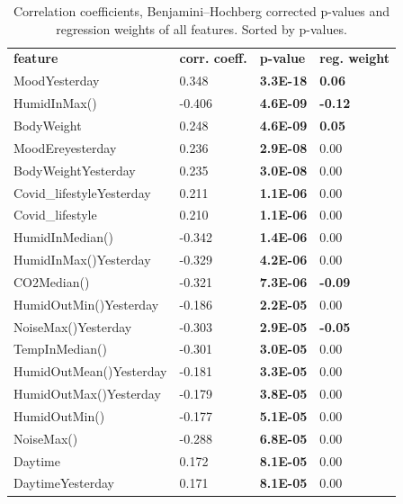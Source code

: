 \documentclass[conference]{IEEEtran}
\begin{document}
\begin{table}[]
\caption[]{Correlation coefficients, Benjamini–Hochberg corrected p-values and regression weights of all features. Sorted by p-values.}
\label{tab:features}

\begin{tabular}{llll}
\textbf{feature} & \textbf{corr. coeff.} & \textbf{p-value} & \textbf{reg. weight} \\
MoodYesterday                  & 0.348  & \textbf{3.3E-18} & \textbf{0.06}  \\
HumidInMax()                   & -0.406 & \textbf{4.6E-09} & \textbf{-0.12} \\
BodyWeight                     & 0.248  & \textbf{4.6E-09} & \textbf{0.05}  \\
MoodEreyesterday               & 0.236  & \textbf{2.9E-08} & 0.00           \\
BodyWeightYesterday            & 0.235  & \textbf{3.0E-08} & 0.00           \\
Covid\_lifestyleYesterday      & 0.211  & \textbf{1.1E-06} & 0.00           \\
Covid\_lifestyle               & 0.210  & \textbf{1.1E-06} & 0.00           \\
HumidInMedian()                & -0.342 & \textbf{1.4E-06} & 0.00           \\
HumidInMax()Yesterday          & -0.329 & \textbf{4.2E-06} & 0.00           \\
CO2Median()                    & -0.321 & \textbf{7.3E-06} & \textbf{-0.09} \\
HumidOutMin()Yesterday         & -0.186 & \textbf{2.2E-05} & 0.00           \\
NoiseMax()Yesterday            & -0.303 & \textbf{2.9E-05} & \textbf{-0.05} \\
TempInMedian()                 & -0.301 & \textbf{3.0E-05} & 0.00           \\
HumidOutMean()Yesterday        & -0.181 & \textbf{3.3E-05} & 0.00           \\
HumidOutMax()Yesterday         & -0.179 & \textbf{3.8E-05} & 0.00           \\
HumidOutMin()                  & -0.177 & \textbf{5.1E-05} & 0.00           \\
NoiseMax()                     & -0.288 & \textbf{6.8E-05} & 0.00           \\
Daytime                        & 0.172  & \textbf{8.1E-05} & 0.00           \\
DaytimeYesterday               & 0.171  & \textbf{8.1E-05} & 0.00           \\

\end{tabular}
\end{table}
\end{document}
